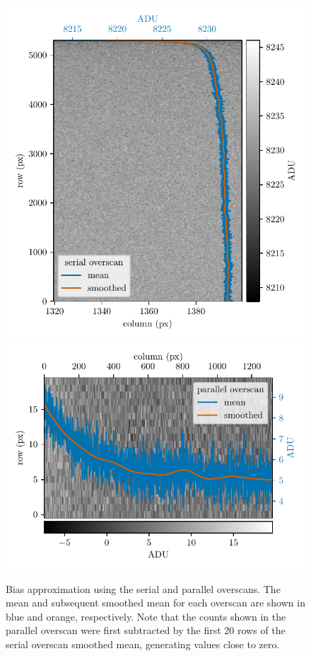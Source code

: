 \begin{figure}
    \centering
    \includegraphics{figures-4/ser_oscan}
    \includegraphics{figures-4/vert_oscan}
    \caption[EXPRES detector bias approximation from overscan regions]{Bias approximation using the serial and parallel overscans. The mean and subsequent smoothed mean for each overscan are shown in blue and orange, respectively. Note that the counts shown in the parallel overscan were first subtracted by the first 20 rows of the serial overscan smoothed mean, generating values close to zero.}
    \label{fig:overscan}
\end{figure}


